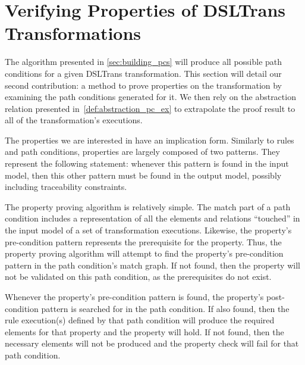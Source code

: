 \section{Verifying Properties of DSLTrans Transformations}
\label{sec:verif_dsltrans_props}





The algorithm presented in \cref{sec:building_pcs} will produce all possible
path conditions for a given DSLTrans transformation. This section will detail
our second contribution: a method to prove properties on the transformation by
examining the path conditions generated for it. We then rely on the abstraction
relation presented in~\cref{def:abstraction_pc_ex} to extrapolate the proof
result to all of the transformation's executions.

The properties we are interested in have an implication form. Similarly to rules and path conditions, properties are largely composed of two patterns. They represent the following statement: whenever this pattern is found in the input model, then
this other pattern must be found in the output model, possibly including traceability constraints.

The property proving algorithm is relatively simple. The match part of a path condition
includes a representation of all the elements and relations ``touched'' in the input model of a set of transformation executions. Likewise, the property's pre-condition pattern represents the prerequisite for the property. Thus, the
property proving algorithm will attempt to find the property's pre-condition pattern in the path condition's match graph. If not found, then the property will not be validated on this path condition, as the prerequisites do not exist.

Whenever the property's pre-condition pattern is found, the property's
post-condition pattern is searched for in the path condition. If
also found, then the rule execution(s) defined by that path condition will produce
the required elements for that property and the property will hold. If not
found, then the necessary elements will not be produced and the property check
will fail for that path condition.


